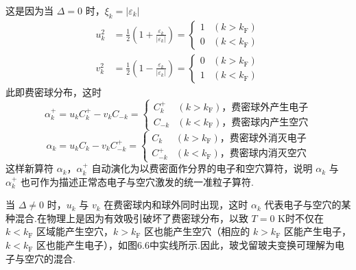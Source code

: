 这是因为当 $\Delta=0$ 时，$\xi_{k}=|\varepsilon_{k}|$
\begin{equation}
\begin{aligned}
  u_{k}^{2}&=\frac{1}{2}\left(1+\frac{\varepsilon_{k}}{|\varepsilon_{k}|}\right)
  =\begin{cases}1&(k>k_{\mathrm{F}})\\0&(k<k_{\mathrm{F}})\end{cases}\\
  v_{k}^{2}&=\frac{1}{2}\left(1-\frac{\varepsilon_{k}}{|\varepsilon_{k}|}\right)
  =\begin{cases}0&(k>k_{\mathrm{F}})\\1&(k<k_{\mathrm{F}})\end{cases}
\end{aligned}
\end{equation}
此即费密球分布，这时
\begin{equation*}
  \alpha^{+}_{k}=u_{k}C^{+}_{k}-v_{k}C_{-k}
  =\begin{cases}
    C^{+}_{k} & (k>k_{\mathrm{F}})\text{，费密球外产生电子}\\
    C_{-k} & (k<k_{\mathrm{F}})\text{，费密球内产生空穴}
  \end{cases}
\end{equation*}
\begin{equation*}
  \alpha_{k}=u_{k}C_{k}-v_{k}C^{+}_{-k}
  =\begin{cases}
    C_{k} & (k>k_{\mathrm{F}})\text{，费密球外消灭电子}\\
    C^{+}_{-k} & (k<k_{\mathrm{F}})\text{，费密球内消灭空穴}
  \end{cases}
\end{equation*}
这样新算符 $\alpha_{k}$，$\alpha^{+}_{k}$ 自动演化为以费密面作分界的电子和空穴算符，说明 $\alpha_{k}$ 与 $\alpha^{+}_{k}$ 也可作为描述正常态电子与空穴激发的统一准粒子算符.

当 $\Delta\neq0$ 时，$u_{k}$ 与 $v_{k}$ 在费密球内和球外同时出现，这时 $\alpha_{k}$ 代表电子与空穴的某种混合.在物理上是因为有效吸引破坏了费密球分布，以致 $T=0$ K时不仅在 $k<k_{\mathrm{F}}$ 区域能产生空穴，$k>k_{\mathrm{F}}$ 区也能产生空穴（相应的 $k>k_{\mathrm{F}}$ 区能产生电子，$k<k_{\mathrm{F}}$ 区也能产生电子），如图6.6中实线所示.因此，玻戈留玻夫变换可理解为电子与空穴的混合.

